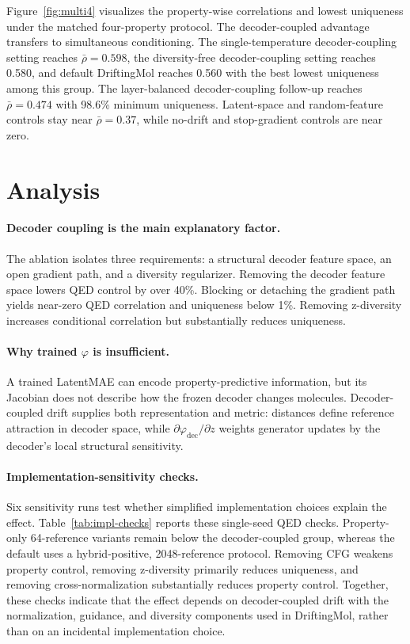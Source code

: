 \documentclass[letterpaper]{article}
\begin{document}
Figure~\ref{fig:multi4} visualizes the property-wise correlations and lowest
uniqueness under the matched four-property protocol.
The decoder-coupled advantage transfers to simultaneous conditioning.
The single-temperature decoder-coupling setting reaches $\bar{\rho}=0.598$, the diversity-free
decoder-coupling setting reaches 0.580, and default DriftingMol reaches 0.560 with the best
lowest uniqueness among this group. The layer-balanced decoder-coupling follow-up
reaches $\bar{\rho}=0.474$ with 98.6\% minimum uniqueness. Latent-space and
random-feature controls stay near $\bar{\rho}=0.37$, while no-drift and
stop-gradient controls are near zero.

\section{Analysis}

\paragraph{Decoder coupling is the main explanatory factor.}
The ablation isolates three requirements: a structural decoder feature space,
an open gradient path, and a diversity regularizer. Removing the decoder
feature space lowers QED control by over 40\%. Blocking or detaching the
gradient path yields near-zero QED correlation and uniqueness below 1\%.
Removing z-diversity increases conditional correlation but substantially
reduces uniqueness.

\paragraph{Why trained $\varphi$ is insufficient.}
A trained LatentMAE can encode property-predictive information, but its
Jacobian does not describe how the frozen decoder changes molecules.
Decoder-coupled drift supplies both representation and metric: distances define
reference attraction in decoder space, while
$\partial \varphi_{\mathrm{dec}}/\partial z$ weights generator updates by the
decoder's local structural sensitivity.

\paragraph{Implementation-sensitivity checks.}
Six sensitivity runs test whether simplified implementation choices explain
the effect. Table~\ref{tab:impl-checks} reports these single-seed QED checks.
Property-only 64-reference variants remain below the decoder-coupled group,
whereas the default uses a hybrid-positive, 2048-reference protocol. Removing
CFG weakens property control, removing
z-diversity primarily reduces uniqueness, and removing cross-normalization
substantially reduces property control. Together, these checks indicate that
the effect depends on decoder-coupled drift with the normalization, guidance,
and diversity components used in DriftingMol, rather than on an incidental
implementation choice.
\end{document}
